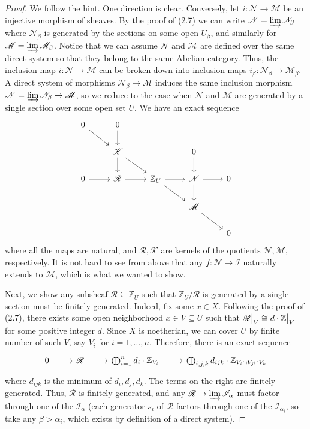 \documentclass{article}
\newcommand{\fM}{\mathscr{M}}
\newcommand{\fI}{\mathscr{I}}
\newcommand{\fK}{\mathscr{K}}
\newcommand{\fN}{\mathscr{N}}
\newcommand{\fR}{\mathscr{R}}
\newcommand{\Z}{\mathbb{Z}}
\newcommand\restr[2]{{\left.\kern-\nulldelimiterspace #1 \vphantom{\big|} \right|_{#2}}}
\begin{document}
\begin{enumerate} [label=\textbf{\arabic*.}, leftmargin=0em]
\begin{proof} 
We follow the hint. One direction is clear. Conversely, let $i : \fN \to \fM$ be an injective morphism of sheaves. By the proof of (2.7) we can write $\fN = \varinjlim \fN_\beta$ where $\fN_\beta$ is generated by the sections on some open $U_\beta$, and similarly for $\fM = \varinjlim \fM_\beta$. Notice that we can assume $\fN$ and $\fM$ are defined over the same direct system so that they belong to the same Abelian category. Thus, the inclusion map $i : \fN \to \fM$ can be broken down into inclusion maps $i_\beta : \fN_\beta \to \fM_\beta$. A direct system of morphisms $\fN_\beta \to \fM$ induces the same inclusion morphism $\fN = \varinjlim \fN_\beta \to \fM$, so we reduce to the case when $\fN$ and $\fM$ are generated by a single section over some open set $U$. We have an exact sequence
\[ \begin{tikzcd}
    0 \arrow[rd] & 0 \arrow[d]              &                           &                         &   \\
                 & \fK \arrow[rd] \arrow[d] &                           & 0 \arrow[d]             &   \\
    0 \arrow[r]  & \fR \arrow[r]            & \Z_U \arrow[r] \arrow[rd] & \fN \arrow[r] \arrow[d] & 0 \\
                 &                          &                           & \fM \arrow[rd]          &   \\
                 &                          &                           &                         & 0
    \end{tikzcd} \]
where all the maps are natural, and $\fR, \fK$ are kernels of the quotients $\fN, \fM$, respectively. It is not hard to see from above that any $f : \fN \to \fI$ naturally extends to $\fM$, which is what we wanted to show.

Next, we show any subsheaf $\fR \subseteq \Z_U$ such that $\Z_U / \fR$ is generated by a single section must be finitely generated. Indeed, fix some $x \in X$. Following the proof of (2.7), there exists some open neighborhood $x \in V \subseteq U$ such that $\restr{\fR}{V} \cong d \cdot \restr{\Z}{V}$ for some positive integer $d$. Since $X$ is noetherian, we can cover $U$ by finite number of such $V$, say $V_i$ for $i = 1, \dots, n$. Therefore, there is an exact sequence
\[ \begin{tikzcd}
    0 \arrow[r] & \fR \arrow[r] & \bigoplus_{i = 1}^n d_i \cdot \Z_{V_i} \arrow[r] & {\bigoplus_{i,j,k} d_{ijk} \cdot \Z_{V_i \cap V_j \cap V_k}}
    \end{tikzcd} \]
where $d_{ijk}$ is the minimum of $d_i, d_j, d_k$. The terms on the right are finitely generated. Thus, $\fR$ is finitely generated, and any $\fR \to \varinjlim \fI_\alpha$ must factor through one of the $\fI_\alpha$ (each generator $s_i$ of $\fR$ factors through one of the $\fI_{\alpha_i}$, so take any $\beta > \alpha_i$, which exists by definition of a direct system).
\end{proof}


\end{enumerate}
\end{document}
